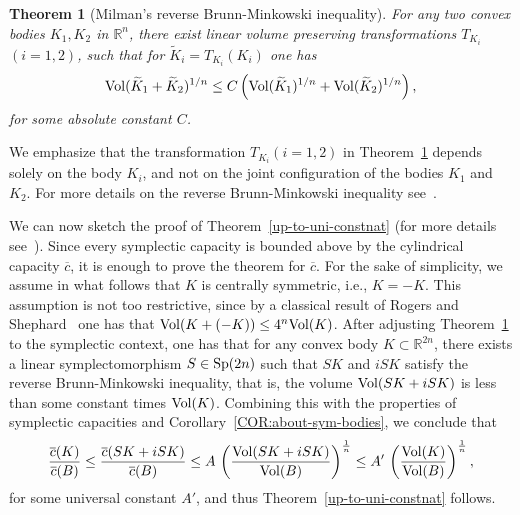 \documentclass{icmart}
\newtheorem{theorem}{Theorem}[section]
\theoremstyle{definition}
\begin{document}

\begin{theorem}[Milman's reverse Brunn-Minkowski inequality] \label{RBMIneq}
For any two convex bodies $K_1,K_2$ in ${\mathbb R}^n$, there exist linear volume preserving
transformations $T_{K_i}$ $(i=1,2)$, such that  for $\widetilde K_i = T_{K_i}(K_i)$ one has
$$ {\rm Vol} (\widetilde K_1+ \widetilde K_2)^{1/n} \leq  C \left ( {\rm Vol}(\widetilde K_1)^{1/n} + {\rm Vol}(\widetilde K_2)^{1/n} \right),$$
for some absolute constant $C$.
\end{theorem}
We emphasize that the transformation $T_{K_i} (i=1,2)$ in Theorem~\ref{RBMIneq} depends solely on the body $K_i$, and not on the joint configuration of the bodies $K_1$ and $K_2$. For more details on the reverse Brunn-Minkowski inequality see~\cite{Milm1317,P1}.

\smallskip

We can now sketch the proof of Theorem~\ref{up-to-uni-constnat} (for  more details see~\cite{AMO}). Since every symplectic capacity is bounded above by the cylindrical capacity  $\overline c$, it is enough to prove the theorem for $\overline c$. For the sake of simplicity, we assume in what follows that $K$ is centrally symmetric, i.e., $K=-K$.  This assumption is not too restrictive, since by a classical result of Rogers and Shephard~\cite{RogShe} one has that ${\rm Vol}(K+(-K)) \leq 4^n {\rm Vol}(K)$. 
After adjusting Theorem~\ref{RBMIneq} to the symplectic context, one has that for
any convex body $K \subset {\mathbb R}^{2n}$, there exists a linear symplectomorphism $S \in {\rm Sp}(2n)$ such that $SK$ and $iSK$ satisfy
the reverse Brunn-Minkowski inequality, that is, the volume  ${\rm Vol}(SK + iSK)$ is less than some constant times ${\rm Vol}(K)$. 
Combining this with the properties of symplectic capacities and Corollary~\ref{COR:about-sym-bodies}, 
%
%
%
we conclude that 
$$  {\frac {\overline c(K)} {\overline c(B)}}  \leq  {\frac {\overline c(SK+iSK)} {\overline c(B)}}   \leq A \, \left  (   {\frac {{\rm Vol}(SK+iSK)} {{\rm Vol}(B)}} \right )^{\frac 1 n}  \leq  A'  \, \left (   {\frac {{\rm Vol}(K)} {{\rm Vol}(B)}} \right )^{\frac 1 n} ,$$
for some universal constant $A'$, and thus Theorem~\ref{up-to-uni-constnat}  follows.   


%
%
%
\end{document}
